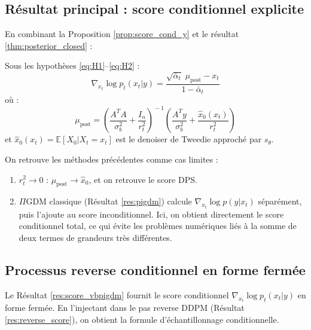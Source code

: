 \documentclass[12pt]{article}
\begin{document}
\subsection{Résultat principal : score conditionnel explicite}

En combinant la Proposition \ref{prop:score_cond_y} et le résultat \ref{thm:posterior_closed} :

\begin{resultbox}
\label{res:score_vbpigdm}
Sous les hypothèses \ref{eq:H1}--\ref{eq:H2} :
\begin{equation}
    \boxed{\nabla_{x_t} \log p_t(x_t | y) = \frac{\sqrt{\bar\alpha_t}\;\mu_{\text{post}} - x_t}{1 - \bar\alpha_t}}
    \label{eq:score_vbpigdm}
\end{equation}
où :
\[
\mu_{\text{post}} = \left(\frac{A^T A}{\sigma_b^2} + \frac{I_n}{r_t^2}\right)^{\!-1} \left(\frac{A^T y}{\sigma_b^2} + \frac{\hat{x}_0(x_t)}{r_t^2}\right)
\]
et $\hat{x}_0(x_t) = \mathbb{E}[X_0 | X_t = x_t]$ est le denoiser de Tweedie approché par $s_\theta$.
\end{resultbox}

\begin{remarkbox}
On retrouve les méthodes précédentes comme cas limites :
\begin{enumerate}[label=(\roman*)]
    \item $r_t^2 \to 0$ : $\mu_{\text{post}} \to \hat{x}_0$, et on retrouve le score DPS.
    \item $\Pi$GDM classique (Résultat \ref{res:pigdm}) calcule $\nabla_{x_t} \log p(y | x_t)$ séparément, puis l'ajoute au score inconditionnel. Ici, on obtient directement le score conditionnel total, ce qui évite les problèmes numériques liés à la somme de deux termes de grandeurs très différentes.
\end{enumerate}
\end{remarkbox}






\subsection{Processus reverse conditionnel en forme fermée}

Le Résultat \ref{res:score_vbpigdm} fournit le score conditionnel $\nabla_{x_t} \log p_t(x_t | y)$ en forme fermée. En l'injectant dans le pas reverse DDPM (Résultat \ref{res:reverse_score}), on obtient la formule d'échantillonnage conditionnelle.
\end{document}
